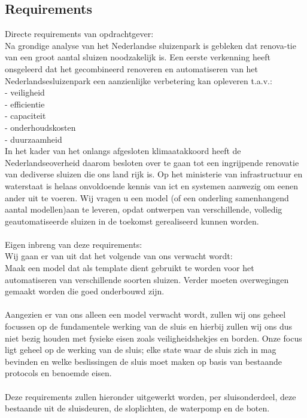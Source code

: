 \documentclass{article}
\begin{document}
	
	\subsection{Requirements}
	Directe requirements van opdrachtgever:\\
	Na grondige analyse van het Nederlandse sluizenpark is gebleken dat renova-tie van een groot aantal sluizen noodzakelijk is.  Een eerste verkenning heeft onsgeleerd dat het gecombineerd renoveren en automatiseren van het Nederlandsesluizenpark een aanzienlijke verbetering kan opleveren t.a.v.:\\
	- veiligheid\\
	- efficientie\\
	- capaciteit\\
	- onderhoudskosten\\
	- duurzaamheid\\
	In het kader van het onlangs afgesloten klimaatakkoord heeft de Nederlandseoverheid  daarom  besloten  over te gaan tot een ingrijpende renovatie van dediverse sluizen die ons land rijk is. Op het ministerie van infrastructuur en waterstaat is helaas onvoldoende kennis van ict en systemen aanwezig om eenen ander uit te voeren. Wij vragen u een model (of een onderling samenhangend aantal modellen)aan  te leveren, opdat ontwerpen van verschillende, volledig geautomatiseerde sluizen in de toekomst gerealiseerd kunnen worden.\\\\
	Eigen inbreng van deze requirements:\\
	Wij gaan er van uit dat het volgende van ons verwacht wordt:\\
	Maak een model dat als template dient gebruikt te worden voor het automatiseren van verschillende soorten sluizen. Verder moeten overwegingen gemaakt worden die goed onderbouwd zijn.\\\\ Aangezien er van ons alleen een model verwacht wordt, zullen wij ons geheel focussen op de fundamentele werking van de sluis en hierbij zullen wij ons dus niet bezig  houden met fysieke eisen zoals veiligheidshekjes en borden. Onze focus ligt geheel op de werking van de sluis; elke state waar de sluis zich in mag bevinden en welke beslissingen de sluis moet maken op basis van bestaande protocols en benoemde eisen. \\\\
	Deze requirements zullen hieronder uitgewerkt worden, per sluisonderdeel, deze bestaande uit de sluisdeuren, de sloplichten, de waterpomp en de boten.\\
	
\end{document}
